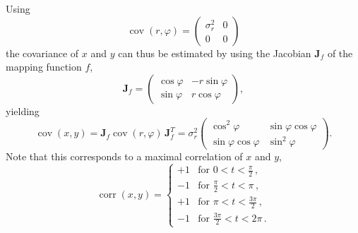 \documentclass{article}
\begin{document}
Using
\begin{equation}
    \operatorname{cov}(r, \varphi) = \begin{pmatrix} \sigma^2_r & 0 \\ 0 & 0 \end{pmatrix}
\end{equation}
the covariance of $x$ and $y$ can thus be estimated by using the Jacobian $\bm{J}_f$ of the mapping function $f$,
\begin{equation}
    \bm{J}_f = \begin{pmatrix} \cos \varphi & -r \sin \varphi \\ \sin \varphi & r \cos \varphi \end{pmatrix},
\end{equation}
yielding
\begin{equation}
    \operatorname{cov}(x, y) = \bm{J}_f \operatorname{cov}(r, \varphi)  \, \bm{J}_f^T = \sigma_r^2 \begin{pmatrix} \cos^2 \varphi & \sin \varphi \cos \varphi \\ \sin \varphi \cos \varphi & \sin^2 \varphi \end{pmatrix}.
\end{equation}
Note that this corresponds to a maximal correlation of $x$ and $y$,
\begin{equation}
    \operatorname{corr}(x, y) =
    \begin{cases}
        +1 & \text{for } 0 < t < \frac{\pi}{2} \,, \\
        -1 & \text{for } \frac{\pi}{2} < t < \pi \,, \\
        +1 & \text{for } \pi < t < \frac{3\pi}{2} \,, \\
        -1 & \text{for } \frac{3\pi}{2} < t <  2\pi \,.
    \end{cases}
\end{equation}
\end{document}
